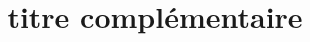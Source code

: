 \documentclass[11pt,a4paper,sans]{moderncv}
\title{titre complémentaire}
\begin{document}
\makecvtitle
\end{document}
